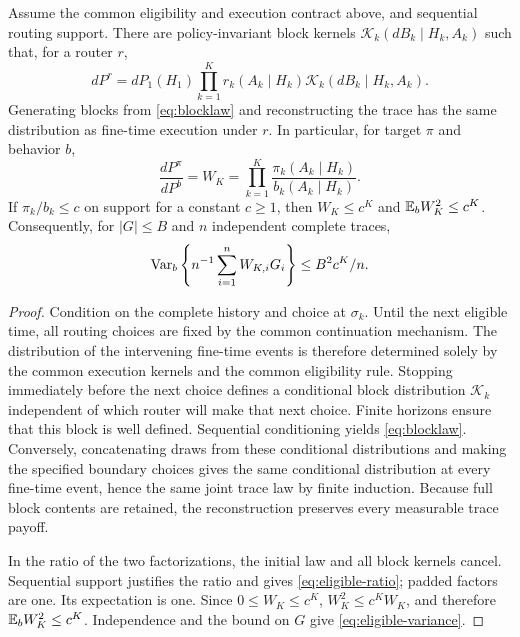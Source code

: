 \begin{theorem}
\label{thm:eligible}
Assume the common eligibility and execution contract above, and sequential routing support. There are policy-invariant block kernels $\mathcal K_k(dB_k\mid H_k,A_k)$ such that, for a router $r$,
\begin{equation}
 dP^r=dP_1(H_1)\prod_{k=1}^{K}r_k(A_k\mid H_k)
        \mathcal K_k(dB_k\mid H_k,A_k).
 \label{eq:blocklaw}
\end{equation}
Generating blocks from \eqref{eq:blocklaw} and reconstructing the trace has the same distribution as fine-time execution under $r$. In particular, for target $\pi$ and behavior $b$,
\begin{equation}
 \frac{dP^\pi}{dP^b}
 =W_K=\prod_{k=1}^{K}\frac{\pi_k(A_k\mid H_k)}{b_k(A_k\mid H_k)}.
 \label{eq:eligible-ratio}
\end{equation}
If $\pi_k/b_k\le c$ on support for a constant $c\ge1$, then $W_K\le c^K$ and $\mathbb{E}_b W_K^2\le c^K$. Consequently, for $|G|\le B$ and $n$ independent complete traces,
\begin{equation}
 \operatorname{Var}_b\left\{n^{-1}\sum_{i=1}^nW_{K,i}G_i\right\}
 \le B^2c^K/n.
 \label{eq:eligible-variance}
\end{equation}
\end{theorem}

\begin{proof}
Condition on the complete history and choice at $\sigma_k$. Until the next eligible time, all routing choices are fixed by the common continuation mechanism. The distribution of the intervening fine-time events is therefore determined solely by the common execution kernels and the common eligibility rule. Stopping immediately before the next choice defines a conditional block distribution $\mathcal K_k$ independent of which router will make that next choice. Finite horizons ensure that this block is well defined. Sequential conditioning yields \eqref{eq:blocklaw}. Conversely, concatenating draws from these conditional distributions and making the specified boundary choices gives the same conditional distribution at every fine-time event, hence the same joint trace law by finite induction. Because full block contents are retained, the reconstruction preserves every measurable trace payoff.

In the ratio of the two factorizations, the initial law and all block kernels cancel. Sequential support justifies the ratio and gives \eqref{eq:eligible-ratio}; padded factors are one. Its expectation is one. Since $0\le W_K\le c^K$, $W_K^2\le c^KW_K$, and therefore $\mathbb{E}_bW_K^2\le c^K$. Independence and the bound on $G$ give \eqref{eq:eligible-variance}.
\end{proof}


